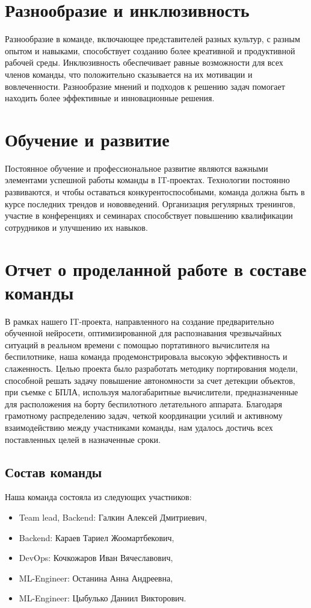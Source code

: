    \section{Разнообразие и инклюзивность}
    Разнообразие в команде, включающее представителей разных культур, с разным опытом и навыками, способствует созданию более креативной и продуктивной рабочей среды. Инклюзивность обеспечивает равные возможности для всех членов команды, что положительно сказывается на их мотивации и вовлеченности. Разнообразие мнений и подходов к решению задач помогает находить более эффективные и инновационные решения.

    \section{Обучение и развитие}
    Постоянное обучение и профессиональное развитие являются важными элементами успешной работы команды в IT-проектах. Технологии постоянно развиваются, и чтобы оставаться конкурентоспособными, команда должна быть в курсе последних трендов и нововведений. Организация регулярных тренингов, участие в конференциях и семинарах способствует повышению квалификации сотрудников и улучшению их навыков.

    \section{Отчет о проделанной работе в составе команды}
    В рамках нашего IT-проекта, направленного на создание предварительно обученной нейросети, оптимизированной для распознавания чрезвычайных ситуаций в реальном времени с помощью портативного вычислителя на беспилотнике, наша команда продемонстрировала высокую эффективность и слаженность. Целью проекта было разработать методику портирования модели, способной решать задачу повышение автономности за счет детекции объектов, при съемке с БПЛА, используя малогабаритные вычислители, предназначенные для расположения на борту беспилотного летательного аппарата. Благодаря грамотному распределению задач, четкой координации усилий и активному взаимодействию между участниками команды, нам удалось достичь всех поставленных целей в назначенные сроки.

    \subsection*{Состав команды}
    Наша команда состояла из следующих участников:
    \begin{itemize} 
        \item Team lead, Backend: Галкин Алексей Дмитриевич,
        \item Backend: Караев Тариел Жоомартбекович,
        \item DevOps: Кочкожаров Иван Вячеславович,
        \item ML-Engineer: Останина Анна Андреевна,
        \item ML-Engineer: Цыбулько Даниил Викторович.
    \end{itemize}

